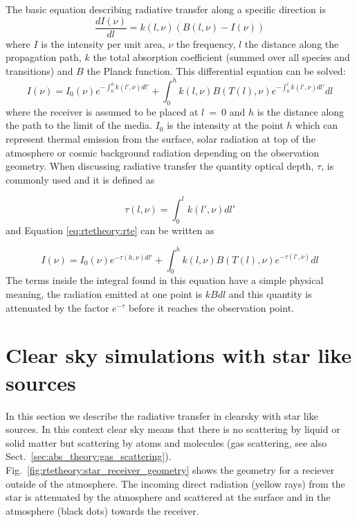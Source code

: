  The basic equation describing radiative transfer along a specific 
 direction is
 \begin{equation}
   \frac{dI(\nu)}{dl} = k(l,\nu)(B(l,\nu)-I(\nu))
  \label{eq:rtetheory:chand}
 \end{equation} 
 where $I$ is the intensity per unit area, $\nu$ the frequency, $l$
 the distance along the propagation path, $k$ the total absorption
 coefficient (summed over all species and transitions) and $B$ the
 Planck function. This differential equation can be solved:
 \begin{equation}
   I(\nu) = I_0(\nu)e^{-\int^h_0{k(l',\nu)dl'}} + 
     \int^h_0{k(l,\nu)B(T(l),\nu) e^{-\int^l_0{k(l',\nu)dl'}} dl}
  \label{eq:rtetheory:rte}
 \end{equation}  
 where the receiver is assumed to be placed at $l$~=~0 and $h$ is the
 distance along the path to the limit of the media. $I_0$ is the
 intensity at the point $h$ which can represent thermal emission from
 the surface, solar radiation at top of the atmosphere or cosmic
 background radiation depending on the observation geometry. When
 discussing radiative transfer the quantity optical depth, $\tau$, is
 commonly used and it is defined as

 \begin{equation}
   \tau(l,\nu) = \int^l_0{k(l',\nu)dl'} 
  \label{eq:rtetheory:tau}
 \end{equation}  
 and Equation \ref{eq:rtetheory:rte} can be written as
 
 \begin{equation}
   I(\nu) = I_0(\nu)e^{-\tau(h,\nu)dl'} + 
     \int^h_0{k(l,\nu)B(T(l),\nu) e^{-\tau(l',\nu)} dl}
  \label{eq:rtetheory:rte2}
 \end{equation}  
 The terms inside the integral found in this equation have a simple
 physical meaning, the radiation emitted at one point is $kBdl$ and this
 quantity is attenuated by the factor $e^{-\tau}$ before it reaches the
 observation point.

\section{Clear sky simulations with star like sources}
\label{sec:rtetheory:ClearskyDirectSources}

In this section we describe the radiative transfer in clearsky with star
like sources.
In this context clear sky means that there is no scattering by liquid or
solid matter but scattering by atoms and molecules (gas scattering, see also
Sect.~\ref{sec:abs_theory:gas_scattering}).
Fig.~\ref{fig:rtetheory:star_receiver_geometry} shows the geometry for a
reciever outside of the atmosphere. The incoming direct radiation (yellow rays)
from the star is attenuated by the atmosphere and scattered at the surface and
in the atmosphere (black dots) towards the receiver.

